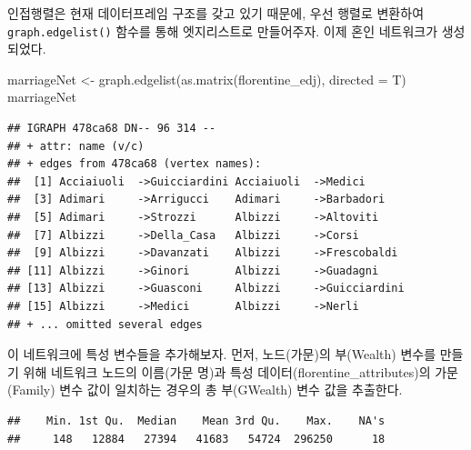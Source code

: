 \documentclass[
]{book}
\newenvironment{Shaded}{\begin{snugshade}}{\end{snugshade}}
\newcommand{\AttributeTok}[1]{\textcolor[rgb]{0.77,0.63,0.00}{#1}}
\newcommand{\FunctionTok}[1]{\textcolor[rgb]{0.00,0.00,0.00}{#1}}
\newcommand{\NormalTok}[1]{#1}
\newcommand{\OtherTok}[1]{\textcolor[rgb]{0.56,0.35,0.01}{#1}}
\newcommand{\SpecialCharTok}[1]{\textcolor[rgb]{0.00,0.00,0.00}{#1}}
\begin{document}
인접행렬은 현재 데이터프레임 구조를 갖고 있기 때문에, 우선 행렬로 변환하여 \texttt{graph.edgelist()} 함수를 통해 엣지리스트로 만들어주자. 이제 혼인 네트워크가 생성되었다.

\begin{Shaded}
\begin{Highlighting}[]
\NormalTok{marriageNet }\OtherTok{\textless{}{-}} \FunctionTok{graph.edgelist}\NormalTok{(}\FunctionTok{as.matrix}\NormalTok{(florentine\_edj), }\AttributeTok{directed =}\NormalTok{ T)}
\NormalTok{marriageNet}
\end{Highlighting}
\end{Shaded}

\begin{verbatim}
## IGRAPH 478ca68 DN-- 96 314 -- 
## + attr: name (v/c)
## + edges from 478ca68 (vertex names):
##  [1] Acciaiuoli  ->Guicciardini Acciaiuoli  ->Medici      
##  [3] Adimari     ->Arrigucci    Adimari     ->Barbadori   
##  [5] Adimari     ->Strozzi      Albizzi     ->Altoviti    
##  [7] Albizzi     ->Della_Casa   Albizzi     ->Corsi       
##  [9] Albizzi     ->Davanzati    Albizzi     ->Frescobaldi 
## [11] Albizzi     ->Ginori       Albizzi     ->Guadagni    
## [13] Albizzi     ->Guasconi     Albizzi     ->Guicciardini
## [15] Albizzi     ->Medici       Albizzi     ->Nerli       
## + ... omitted several edges
\end{verbatim}

이 네트워크에 특성 변수들을 추가해보자. 먼저, 노드(가문)의 부(Wealth) 변수를 만들기 위해 네트워크 노드의 이름(가문 명)과 특성 데이터(florentine\_attributes)의 가문(Family) 변수 값이 일치하는 경우의 총 부(GWealth) 변수 값을 추출한다.

\begin{Shaded}
\end{Shaded}

\begin{verbatim}
##    Min. 1st Qu.  Median    Mean 3rd Qu.    Max.    NA's 
##     148   12884   27394   41683   54724  296250      18
\end{verbatim}
\end{document}
